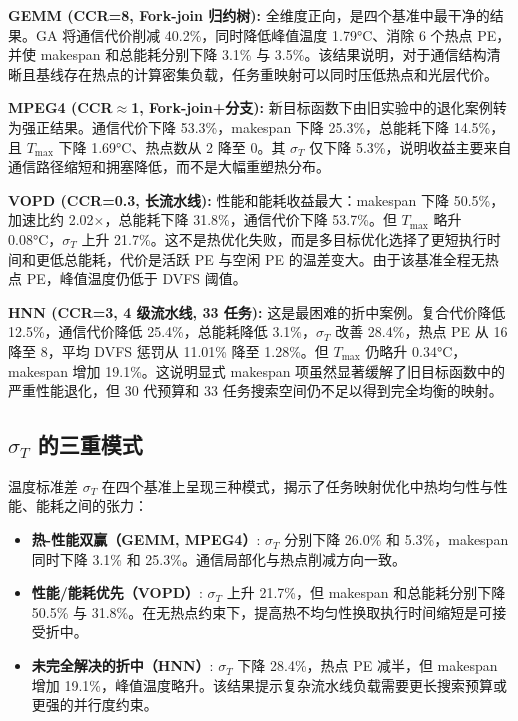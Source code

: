 \documentclass[conference]{IEEEtran}
\begin{document}
\textbf{GEMM (CCR=8, Fork-join 归约树):} 全维度正向，是四个基准中最干净的结果。GA 将通信代价削减 40.2\%，同时降低峰值温度 1.79\si{\degreeCelsius}、消除 6 个热点 PE，并使 makespan 和总能耗分别下降 3.1\% 与 3.5\%。该结果说明，对于通信结构清晰且基线存在热点的计算密集负载，任务重映射可以同时压低热点和光层代价。

\textbf{MPEG4 (CCR$\approx$1, Fork-join+分支):} 新目标函数下由旧实验中的退化案例转为强正结果。通信代价下降 53.3\%，makespan 下降 25.3\%，总能耗下降 14.5\%，且 $T_{\max}$ 下降 1.69\si{\degreeCelsius}、热点数从 2 降至 0。其 $\sigma_T$ 仅下降 5.3\%，说明收益主要来自通信路径缩短和拥塞降低，而不是大幅重塑热分布。

\textbf{VOPD (CCR=0.3, 长流水线):} 性能和能耗收益最大：makespan 下降 50.5\%，加速比约 2.02$\times$，总能耗下降 31.8\%，通信代价下降 53.7\%。但 $T_{\max}$ 略升 0.08\si{\degreeCelsius}，$\sigma_T$ 上升 21.7\%。这不是热优化失败，而是多目标优化选择了更短执行时间和更低总能耗，代价是活跃 PE 与空闲 PE 的温差变大。由于该基准全程无热点 PE，峰值温度仍低于 DVFS 阈值。

\textbf{HNN (CCR=3, 4 级流水线, 33 任务):} 这是最困难的折中案例。复合代价降低 12.5\%，通信代价降低 25.4\%，总能耗降低 3.1\%，$\sigma_T$ 改善 28.4\%，热点 PE 从 16 降至 8，平均 DVFS 惩罚从 11.01\% 降至 1.28\%。但 $T_{\max}$ 仍略升 0.34\si{\degreeCelsius}，makespan 增加 19.1\%。这说明显式 makespan 项虽然显著缓解了旧目标函数中的严重性能退化，但 30 代预算和 33 任务搜索空间仍不足以得到完全均衡的映射。

\subsection{$\sigma_T$ 的三重模式}

温度标准差 $\sigma_T$ 在四个基准上呈现三种模式，揭示了任务映射优化中热均匀性与性能、能耗之间的张力：

\begin{itemize}
\item \textbf{热-性能双赢（GEMM, MPEG4）}: $\sigma_T$ 分别下降 26.0\% 和 5.3\%，makespan 同时下降 3.1\% 和 25.3\%。通信局部化与热点削减方向一致。
\item \textbf{性能/能耗优先（VOPD）}: $\sigma_T$ 上升 21.7\%，但 makespan 和总能耗分别下降 50.5\% 与 31.8\%。在无热点约束下，提高热不均匀性换取执行时间缩短是可接受折中。
\item \textbf{未完全解决的折中（HNN）}: $\sigma_T$ 下降 28.4\%，热点 PE 减半，但 makespan 增加 19.1\%，峰值温度略升。该结果提示复杂流水线负载需要更长搜索预算或更强的并行度约束。
\end{itemize}
\end{document}
